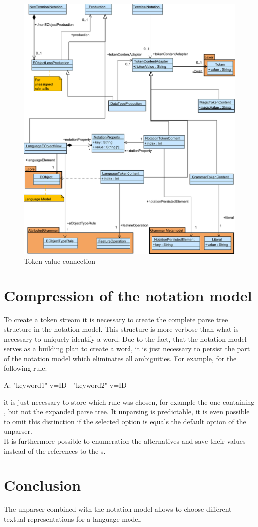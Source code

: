 \begin{figure}
\centering
\includegraphics[scale=0.7]{gfx/ex/Notation_DataLink} 
\caption{Token value connection}
\label{MM:Not:DataLink}
\end{figure}

\section{Compression of the notation model}
To create a token stream it is necessary to create the complete parse tree structure in the notation model. This structure is more verbose than what is necessary to uniquely identify a word. Due to the fact, that the notation model serves as a building plan to create a word, it is just necessary to persist the part of the notation model which eliminates all ambiguities. For example, for the following rule:
\begin{xtxt}
A:  "keyword1" v=ID 
 |  "keyword2" v=ID
\end{xtxt}
it is just necessary to store which rule was chosen, for example the one containing , but not the expanded parse tree. It unparsing is predictable, it is even possible to omit this distinction if the selected option is equals the default option of the unparser.  \\
It is furthermore possible to enumeration the alternatives and save their values instead of the references to the s.

\section{Conclusion}
The unparser combined with the notation model allows to choose different textual representations for a language model. 



